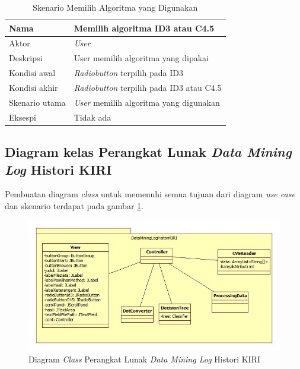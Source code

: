 \begin{table}[H]
\centering
\caption{Skenario Memilih Algoritma yang Digunakan}
\begin{tabular}{|l|l|}
\hline
Nama           & Memilih algoritma ID3 atau C4.5                     \\ \hline
Aktor          & \textit{User}                                       \\ \hline
Deskripsi      & User memilih algoritma yang dipakai          		   \\ \hline
Kondisi awal   & \textsl{Radiobutton} terpilih pada ID3              \\ \hline
Kondisi akhir  & \textsl{Radiobutton} terpilih pada ID3 atau C4.5    \\ \hline
Skenario utama & \textit{User} memilih algoritma yang digunakan 	   \\ \hline
Eksespi        & Tidak ada																					 \\ \hline
\end{tabular}
\end{table}


\subsection{Diagram kelas Perangkat Lunak \textsl{Data Mining Log} Histori KIRI}

Pembuatan diagram \textsl{class} untuk memenuhi semua tujuan dari diagram \textsl{use case} dan skenario terdapat pada gambar \ref{fig:classDiagram}.

\begin{figure}[H]
\includegraphics[scale=0.7]{Gambar/classdiagram.jpg}
\caption[Diagram \textsl{Class} Perangkat Lunak \textsl{Data Mining Log} Histori KIRI]{Diagram \textsl{Class} Perangkat Lunak \textsl{Data Mining Log} Histori KIRI} 
\label{fig:classDiagram}
\end{figure}

